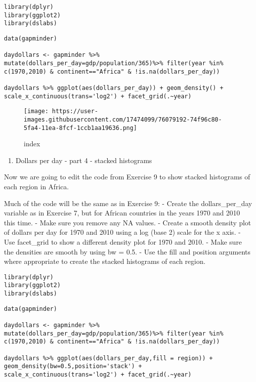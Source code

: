 \documentclass[]{article}
\providecommand{\tightlist}{%
  \setlength{\itemsep}{0pt}\setlength{\parskip}{0pt}}
\begin{document}
\begin{verbatim}
library(dplyr)
library(ggplot2)
library(dslabs)
\end{verbatim}

\begin{verbatim}
data(gapminder)

daydollars <- gapminder %>% mutate(dollars_per_day=gdp/population/365)%>% filter(year %in% c(1970,2010) & continent=="Africa" & !is.na(dollars_per_day))

daydollars %>% ggplot(aes(dollars_per_day)) + geom_density() + scale_x_continuous(trans='log2') + facet_grid(.~year)
\end{verbatim}

\begin{figure}
\centering
\texttt{[image: https://user-images.githubusercontent.com/17474099/76079192-74f96c80-5fa4-11ea-8fcf-1ccb1aa19636.png]}
\caption{index}
\end{figure}

\begin{enumerate}
\def\labelenumi{\arabic{enumi}.}
\setcounter{enumi}{9}
\tightlist
\item
  Dollars per day - part 4 - stacked histograms
\end{enumerate}

Now we are going to edit the code from Exercise 9 to show stacked
histograms of each region in Africa.

Much of the code will be the same as in Exercise 9: - Create the
dollars\_per\_day variable as in Exercise 7, but for African countries
in the years 1970 and 2010 this time. - Make sure you remove any NA
values. - Create a smooth density plot of dollars per day for 1970 and
2010 using a log (base 2) scale for the x axis. - Use facet\_grid to
show a different density plot for 1970 and 2010. - Make sure the
densities are smooth by using bw = 0.5. - Use the fill and position
arguments where appropriate to create the stacked histograms of each
region.

\begin{verbatim}
library(dplyr)
library(ggplot2)
library(dslabs)
\end{verbatim}

\begin{verbatim}
data(gapminder)

daydollars <- gapminder %>% mutate(dollars_per_day=gdp/population/365)%>% filter(year %in% c(1970,2010) & continent=="Africa" & !is.na(dollars_per_day))

daydollars %>% ggplot(aes(dollars_per_day,fill = region)) + geom_density(bw=0.5,position='stack') + scale_x_continuous(trans='log2') + facet_grid(.~year)
\end{verbatim}
\end{document}
